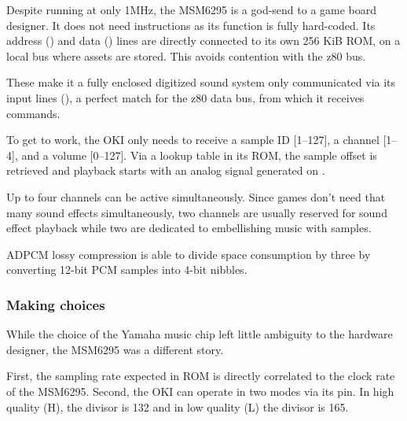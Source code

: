 Despite running at only 1MHz, the MSM6295 is a god-send to a game board designer. It does not need instructions as its function is fully hard-coded. Its address () and data () lines are directly connected to its own 256 KiB ROM, on a local bus where assets are stored. This avoids contention with the z80 bus. 

These make it a fully enclosed digitized sound system only communicated via its input lines (), a perfect match for the z80 data bus, from which it receives commands.

To get to work, the OKI only needs to receive a sample ID [1--127], a channel [1--4], and a volume [0--127]. Via a lookup table in its ROM, the sample offset is retrieved and playback starts with an analog signal generated on .


Up to four channels can be active simultaneously. Since games don't need that many sound effects simultaneously, two channels are usually reserved for sound effect playback while two are dedicated to embellishing music with samples.

ADPCM lossy compression is able to divide space consumption by three by converting 12-bit PCM samples into 4-bit nibbles. 


\subsubsection{Making choices}
While the choice of the Yamaha music chip left little ambiguity to the hardware designer, the MSM6295 was a different story.

First, the sampling rate expected in ROM is directly correlated to the clock rate of the MSM6295. Second, the OKI can operate in two modes via its  pin. In high quality (H), the divisor is 132 and in low quality (L) the divisor is 165.

